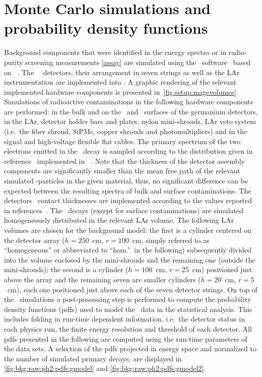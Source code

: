 
\chapter{Monte Carlo simulations and probability density functions}%
\label{apdx:magepdfs}

Background components that were identified in the energy spectra or in
radio-purity screening measurements \cref{assay} are simulated
using the \mage\ software~\cite{Boswell2011} based on
\geant~\cite{Agostinelli2002, Allison2006, Allison2016}.  The \gerda\
\phasetwo\ detectors, their arrangement in seven strings as well as the
LAr instrumentation are implemented into \mage. A graphic rendering of
the relevant implemented hardware components is presented
in~\cref{fig:setup:magevolumes}
\newpar
Simulations of radioactive contaminations
in the following hardware components are performed: in the bulk and on
the \pplus\ and \nplus\ surfaces of the germanium detectors, in the LAr,
detector holder bars and plates, nylon mini-shrouds, LAr veto system
(i.e.~the fiber shroud, SiPMs, copper shrouds and photomultipliers) and
in the signal and high-voltage flexible flat cables. The primary
spectrum of the two electrons emitted in the \nnbb\ decay is sampled
according to the distribution given in reference~\cite{Tretyak1995}
implemented in \decayzero~\cite{Ponkratenko2000}. Note that the
thickness of the detector assembly components are significantly smaller
than the mean free path of the relevant simulated \g-particles in
the given material, thus, no significant difference can be expected
between the resulting spectra of bulk and surface contaminations. The
detectors \nplus\ contact thicknesses are implemented according to the
values reported in references~\cite{Agostini2013a, Agostini2019}.
\newpar
The \kvz\ decays (except for surface contaminations) are simulated
homogeneously distributed in the relevant LAr volume. The following LAr
volumes are chosen for the background model: the first is a cylinder
centered on the detector array ($h=250$~cm, $r=100$~cm, simply referred
to as ``homogeneous'' or abbreviated to ``hom.''~in the following)
subsequently divided into the volume enclosed by the mini-shrouds and
the remaining one (outside the mini-shrouds); the second is a cylinder
($h=100$~cm, $r=25$~cm) positioned just above the array and the
remaining seven are smaller cylinders ($h=20$~cm, $r=5$~cm), each one
positioned just above each of the seven detector strings.
\newpar
On top of the \mage\ simulations a post-processing step is performed to
compute the probability density functions (pdfs) used to model the
\gerda\ data in the statistical analysis. This includes folding in
run-time dependent information, i.e.~the detector status in each physics
run, the finite energy resolution and threshold of each detector. All
pdfs presented in the following are computed using the run-time
parameters of the data sets. A selection of the pdfs projected in energy
space and normalized to the number of simulated primary decays, are
displayed in \cref{fig:bkg:raw:ph2:pdfs:gmodel}
and \cref{fig:bkg:raw:ph2:pdfs:gmodel2}.


